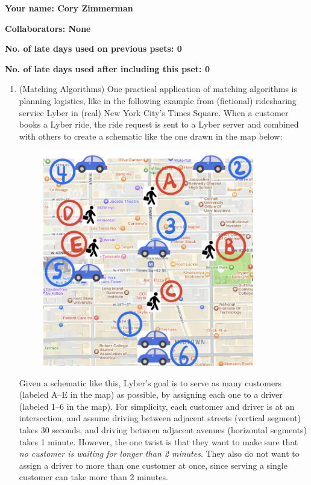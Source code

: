 \documentclass[11pt]{article}
\begin{document}

\textbf{Your name: Cory Zimmerman}

\textbf{Collaborators: None}

\textbf{No. of late days used on previous psets: 0}

\textbf{No. of late days used after including this pset: 0}

\begin{enumerate}
 \item (Matching Algorithms) 
 One practical application of matching algorithms is planning logistics, like in the following example from (fictional) ridesharing service Lyber in (real) New York City's Times Square.  When a customer books a Lyber ride, the ride request is sent to a Lyber server and combined with others to create a schematic 
 like the one drawn in the map below:
\begin{figure}[H]
    \centering
    \includegraphics[width=0.87\textwidth]{NYC-map-zoomed-light.jpeg}
    \label{fig:travel_time_graph}
\end{figure}
Given a schematic like this, Lyber's goal is to serve as many customers (labeled A--E in the map) as possible, by assigning each one to a driver (labeled 1--6 in the map). For simplicity, each customer and driver is at an intersection, and assume driving between adjacent streets (vertical segment) takes 30 seconds, and driving between adjacent avenues (horizontal segments) takes 1 minute. However, the one twist is that they want to make sure that \textit{no customer is waiting for longer than 2 minutes}.  They also do not want to assign a driver to more than one customer at once, since serving a single customer can take more than 2 minutes.


\end{enumerate}
\end{document}
